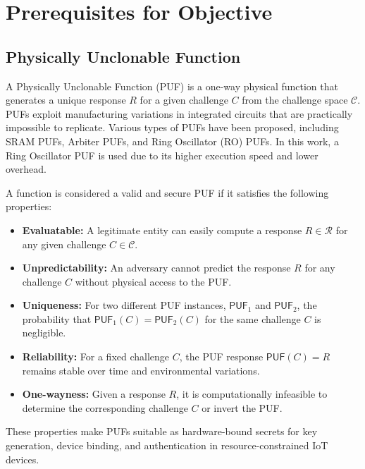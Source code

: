 \chapter{Prerequisites for Objective}

\section{Physically Unclonable Function}

A Physically Unclonable Function (PUF) is a one-way physical function that
generates a unique response $R$ for a given challenge $C$ from the challenge
space $\mathcal{C}$.
PUFs exploit manufacturing variations in integrated circuits that are practically
impossible to replicate.
Various types of PUFs have been proposed, including SRAM PUFs, Arbiter PUFs, and
Ring Oscillator (RO) PUFs.
In this work, a Ring Oscillator PUF is used due to its higher execution speed and
lower overhead.

A function is considered a valid and secure PUF if it satisfies the following
properties:

\begin{itemize}
  \item \textbf{Evaluatable:} A legitimate entity can easily compute a response
    $R \in \mathcal{R}$ for any given challenge $C \in \mathcal{C}$.

  \item \textbf{Unpredictability:} An adversary cannot predict the response $R$ for
    any challenge $C$ without physical access to the PUF.

  \item \textbf{Uniqueness:} For two different PUF instances, $\mathsf{PUF}_1$ and
    $\mathsf{PUF}_2$, the probability that
    $\mathsf{PUF}_1(C) = \mathsf{PUF}_2(C)$ for the same challenge $C$ is
    negligible.

  \item \textbf{Reliability:} For a fixed challenge $C$, the PUF response
    $\mathsf{PUF}(C) = R$ remains stable over time and environmental variations.

  \item \textbf{One-wayness:} Given a response $R$, it is computationally infeasible
    to determine the corresponding challenge $C$ or invert the PUF.
\end{itemize}

These properties make PUFs suitable as hardware-bound secrets for key generation,
device binding, and authentication in resource-constrained IoT devices.

